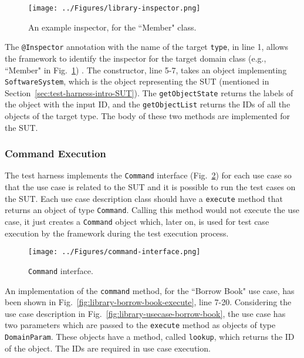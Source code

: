 \begin{figure}[h]
\centering
\texttt{[image: ../Figures/library-inspector.png]}
\caption{An example inspector, for the ``Member" class.}
\label{fig:library-inspector}
\end{figure}

The \texttt{@Inspector} annotation with the name of the target \texttt{type}, in line 1, allows the framework to identify the inspector for the target domain class (e.g., ``Member" in Fig.~\ref{fig:library-inspector}) . The constructor, line 5-7, takes an object implementing \texttt{SoftwareSystem}, which is the object representing the SUT (mentioned in Section~\ref{sec:test-harness-intro-SUT}). The \texttt{getObjectState} returns the labels of the object with the input ID, and the \texttt{getObjectList} returns the IDs of all the objects of the target type. The body of these two methods are implemented for the SUT.

\subsubsection{Command Execution}
\label{sec:test-harness-command-execution}
The test harness implements the \texttt{Command} interface (Fig.~\ref{fig:test-harness-command-interface}) for each use case so that the use case is related to the SUT and it is possible to run the test cases on the SUT. Each use case description class should have a \texttt{execute} method that returns an object of type \texttt{Command}. Calling this method would not execute the use case, it just creates a \texttt{Command} object which, later on, is used for test case execution by the framework during the test execution process.

\begin{figure}[h]
\centering
\texttt{[image: ../Figures/command-interface.png]}
\caption{\texttt{Command} interface.}
\label{fig:test-harness-command-interface}
\end{figure}

An implementation of the \texttt{command} method, for the ``Borrow Book" use case, has been shown in Fig.~\ref{fig:library-borrow-book-execute}, line 7-20. Considering the use case description in Fig.~\ref{fig:library-usecase-borrow-book}, the use case has two parameters which are passed to the \texttt{execute} method as objects of type \texttt{DomainParam}. These objects have a method, called \texttt{lookup}, which returns the ID of the object. The IDs are required in use case execution.

